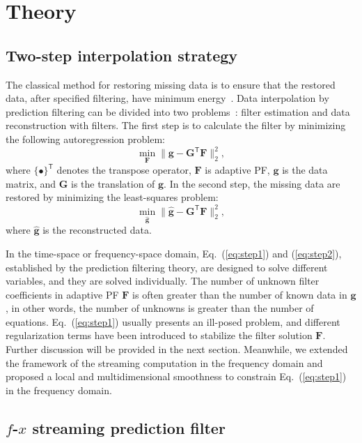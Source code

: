 \section{Theory}

\subsection{Two-step interpolation strategy}

The classical method for restoring missing data is to ensure that the
restored data, after specified filtering, have minimum
energy~\citep{Claerbout92}.  Data interpolation by prediction
filtering can be divided into two problems~\citep{Liu11}: filter
estimation and data reconstruction with filters.  The first step is to
calculate the filter by minimizing the following autoregression
problem:
\begin{equation}
    \label{eq:step1}
    \min_{\mathbf{F}} \| \mathbf{g} - \mathbf{G}^{\mathsf{T}} \mathbf{F} \|_{2}^{2},
\end{equation}
where $\{\bullet\}^{\mathsf{T}}$ denotes the transpose operator,
$\mathbf{F}$ is adaptive PF, $\mathbf{g}$ is the data matrix, and
$\mathbf{G}$ is the translation of $\mathbf{g}$.  In the second step,
the missing data are restored by minimizing the least-squares problem:
\begin{equation}
    \label{eq:step2}
    \min_{\hat{\mathbf{g}}} \| \hat{\mathbf{g}} - \mathbf{G}^{\mathsf{T}}\mathbf{F} \|_{2}^{2},
\end{equation}
where $\hat{\mathbf{g}}$ is the reconstructed data.

In the time-space or frequency-space domain, Eq.~(\ref{eq:step1}) and
(\ref{eq:step2}), established by the prediction filtering theory, are
designed to solve different variables, and they are solved
individually.  The number of unknown filter coefficients in adaptive
PF $\mathbf{F}$ is often greater than the number of known data in
$\mathbf{g}$, in other words, the number of unknowns is greater than
the number of equations.  Eq.~(\ref{eq:step1}) usually presents an
ill-posed problem, and different regularization terms have been
introduced to stabilize the filter solution $\mathbf{F}$.  Further
discussion will be provided in the next section. Meanwhile, we
extended the framework of the streaming computation in the frequency
domain and proposed a local and multidimensional smoothness to
constrain Eq.~(\ref{eq:step1}) in the frequency domain.

\subsection{$f$-$x$ streaming prediction filter}

